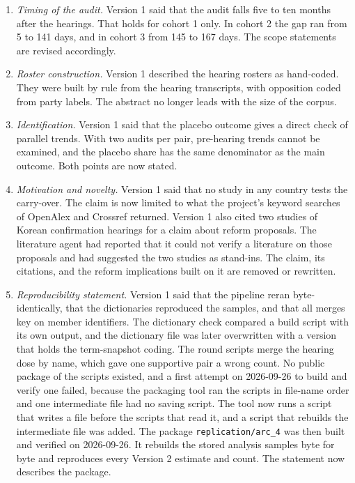 \documentclass[11pt]{article}
\begin{document}
\begin{enumerate}
\item \textit{Timing of the audit.} Version 1 said that the audit falls five to ten months after the hearings. That holds for cohort 1 only. In cohort 2 the gap ran from 5 to 141 days, and in cohort 3 from 145 to 167 days. The scope statements are revised accordingly.
\item \textit{Roster construction.} Version 1 described the hearing rosters as hand-coded. They were built by rule from the hearing transcripts, with opposition coded from party labels. The abstract no longer leads with the size of the corpus.
\item \textit{Identification.} Version 1 said that the placebo outcome gives a direct check of parallel trends. With two audits per pair, pre-hearing trends cannot be examined, and the placebo share has the same denominator as the main outcome. Both points are now stated.
\item \textit{Motivation and novelty.} Version 1 said that no study in any country tests the carry-over. The claim is now limited to what the project's keyword searches of OpenAlex and Crossref returned. Version 1 also cited two studies of Korean confirmation hearings for a claim about reform proposals. The literature agent had reported that it could not verify a literature on those proposals and had suggested the two studies as stand-ins. The claim, its citations, and the reform implications built on it are removed or rewritten.
\item \textit{Reproducibility statement.} Version 1 said that the pipeline reran byte-identically, that the dictionaries reproduced the samples, and that all merges key on member identifiers. The dictionary check compared a build script with its own output, and the dictionary file was later overwritten with a version that holds the term-snapshot coding. The round scripts merge the hearing dose by name, which gave one supportive pair a wrong count. No public package of the scripts existed, and a first attempt on 2026-09-26 to build and verify one failed, because the packaging tool ran the scripts in file-name order and one intermediate file had no saving script. The tool now runs a script that writes a file before the scripts that read it, and a script that rebuilds the intermediate file was added. The package \texttt{replication/arc\_4} was then built and verified on 2026-09-26. It rebuilds the stored analysis samples byte for byte and reproduces every Version 2 estimate and count. The statement now describes the package.

\end{enumerate}
\end{document}
